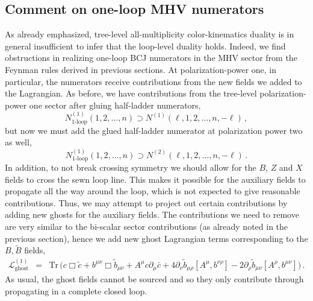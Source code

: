 \documentclass[11pt,a4paper]{article}
\begin{document}
\subsection{Comment on one-loop MHV numerators}
As already emphasized, tree-level all-multiplicity color-kinematics duality is in general insufficient to infer that the loop-level duality holds. Indeed, we find obstructions in realizing one-loop BCJ numerators in the MHV sector from the Feynman rules derived in previous sections. 
At polarization-power one, in particular, the numerators receive contributions from the new fields we added to the Lagrangian. As before, we have contributions from the tree-level polarization-power one sector after gluing half-ladder numerators,
\begin{equation}
    N^{(1)}_{\textrm{1-loop}}(1,2,\ldots,n) \supset N^{(1)}(\ell,1,2,\ldots,n,-\ell) \, ,
\end{equation}
but now we must add the glued half-ladder numerator at polarization power two as well,
\begin{equation}
    N^{(1)}_{\textrm{1-loop}}(1,2,\ldots,n) \supset N^{(2)}(\ell,1,2,\ldots,n,-\ell) \, .
\end{equation}
In addition, to not break crossing symmetry we should allow for the $B$, $Z$ and $X$ fields to cross the sewn loop line. This makes it possible for the auxiliary fields to propagate all the way around the loop, which is not expected to give reasonable contributions. Thus, we may attempt to project out certain contributions by adding new ghosts for the auxiliary fields. The contributions we need to remove are very similar to the bi-scalar sector contributions (as already noted in the previous section), hence we add new ghost Lagrangian terms corresponding to the $B,\tilde B$ fields, 
\begin{eqnarray} \label{GL1}
\mathcal{L}_\text{ghost}^{(1)} &=&
\text{Tr} \, \Big(
c \Box \tilde{c} + b^{\mu\nu}\Box \tilde{b}_{\mu\nu} + 
A^\mu c\partial_\mu \bar{c} + 
4  \partial_\nu \tilde{b}_{\mu \rho} [A^\mu ,b^{\nu \rho}] - 2 \partial_\rho \tilde{b}_{\mu \nu} [ A^\rho,  b^{\mu \nu}]
\Big) \, .
\end{eqnarray}
As usual, the ghost fields cannot be sourced and so they only contribute through propagating in a complete closed loop.
\end{document}
